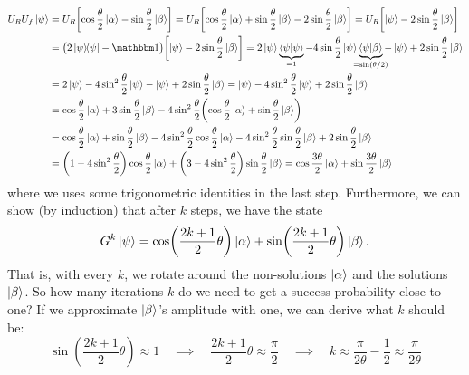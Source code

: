 				\begin{align}
					U_R U_f \ket{\psi}
						&= U_R \biggl[ \cos\frac{\theta}{2} \ket{\alpha} - \sin\frac{\theta}{2} \ket{\beta} \biggr]
						 = U_R \biggl[ \cos\frac{\theta}{2} \ket{\alpha} + \sin\frac{\theta}{2} \ket{\beta} - 2 \sin\frac{\theta}{2} \ket{\beta} \biggr]
						 = U_R \biggl[ \ket{\psi} - 2 \sin\frac{\theta}{2} \ket{\beta} \biggr] \\
						&= \bigl( 2 \ketbra{\psi}{\psi} - \ID \bigr) \biggl[ \ket{\psi} - 2 \sin\frac{\theta}{2} \ket{\beta} \biggr]
						 = 2 \ket{\psi} \underbrace{\ip{\psi}{\psi}}_{\mathclap{= 1}} - 4 \sin\frac{\theta}{2} \ket{\psi} \underbrace{\ip{\psi}{\beta}}_{\mathclap{= \sin(\theta/2)}} - \ket{\psi} + 2 \sin\frac{\theta}{2} \ket{\beta} \\
						&= 2 \ket{\psi} - 4 \sin^2\frac{\theta}{2} \ket{\psi} - \ket{\psi} + 2 \sin\frac{\theta}{2} \ket{\beta}
						 = \ket{\psi} - 4 \sin^2\frac{\theta}{2} \ket{\psi} + 2 \sin\frac{\theta}{2} \ket{\beta} \\
						&= \cos\frac{\theta}{2} \ket{\alpha} + 3 \sin\frac{\theta}{2} \ket{\beta} - 4 \sin^2\frac{\theta}{2} \biggl( \cos\frac{\theta}{2} \ket{\alpha} + \sin\frac{\theta}{2} \ket{\beta} \biggr) \\
						&= \cos\frac{\theta}{2} \ket{\alpha} + \sin\frac{\theta}{2} \ket{\beta} - 4 \sin^2\frac{\theta}{2} \cos\frac{\theta}{2} \ket{\alpha} - 4 \sin^2\frac{\theta}{2}\sin\frac{\theta}{2} \ket{\beta} + 2 \sin\frac{\theta}{2} \ket{\beta} \\
						&= \biggl( 1 - 4 \sin^2\frac{\theta}{2} \biggr) \cos\frac{\theta}{2} \ket{\alpha} + \biggl( 3 - 4 \sin^2\frac{\theta}{2} \biggr) \sin\frac{\theta}{2} \ket{\beta}
						 = \cos\frac{3 \theta}{2} \ket{\alpha} + \sin\frac{3 \theta}{2} \ket{\beta}
				\end{align} %
				where we uses some trigonometric identities in the last step. Furthermore, we can show (by induction) that after \(k\) steps, we have the state
				\begin{equation}
					G^k \ket{\psi} = \cos(\frac{2k + 1}{2} \theta) \ket{\alpha} + \sin(\frac{2k + 1}{2} \theta) \ket{\beta}.
				\end{equation}
				That is, with every \(k\), we rotate around the non-solutions \(\ket{\alpha}\) and the solutions \(\ket{\beta}\). So how many iterations \(k\) do we need to get a success probability close to one? If we approximate \(\ket{\beta}\)'s amplitude with one, we can derive what \(k\) should be:
				\begin{equation}
					\sin(\frac{2k + 1}{2} \theta) \approx 1
					\quad\implies\quad
					\frac{2k + 1}{2} \theta \approx \frac{\pi}{2}
					\quad\implies\quad
					k \approx \frac{\pi}{2 \theta} - \frac{1}{2} \approx \frac{\pi}{2 \theta}
					\label{eq:groversApprox}
				\end{equation}
